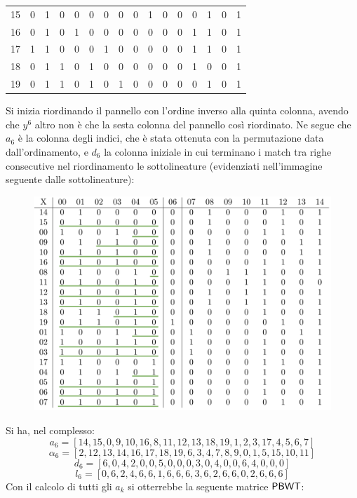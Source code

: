 \begin{esempio}
\begin{table}[H]
\begin{tabular}{c|ccccccccccccccc}
      15 & 0 & 1 & 0 & 0 & 0 & 0 & 0 & 0 & 1 & 0 & 0 & 0 & 1 & 0 & 1 \\
      16 & 0 & 1 & 0 & 1 & 0 & 0 & 0 & 0 & 0 & 0 & 0 & 1 & 1 & 0 & 1 \\
      17 & 1 & 1 & 0 & 0 & 0 & 1 & 0 & 0 & 0 & 0 & 0 & 1 & 1 & 0 & 1 \\
      18 & 0 & 1 & 1 & 0 & 1 & 0 & 0 & 0 & 0 & 0 & 0 & 1 & 0 & 0 & 1 \\
      19 & 0 & 1 & 1 & 0 & 1 & 0 & 1 & 0 & 0 & 0 & 0 & 0 & 1 & 0 & 1 
    \end{tabular}
  \end{table}
  Si inizia riordinando il pannello con l'ordine inverso alla
  quinta colonna, avendo che $y^6$ altro non è che la sesta colonna del pannello
  così riordinato. Ne segue che $a_6$ è la colonna degli indici, che è stata
  ottenuta con la permutazione data dall'ordinamento, e $d_6$ la
  colonna iniziale in cui terminano i match tra righe consecutive nel
  riordinamento le sottolineature (evidenziati nell'immagine seguente dalle
  sottolineature):   
  \begin{figure}[H]
    \centering
    \includegraphics[scale = 0.325]{img/matrix1.pdf}
  \end{figure}
  \noindent
  Si ha, nel complesso:
  \[a_6=[14,15,0,9,10,16,8,11,12,13,18,19,1,2,3,17,4,5,6,7]\]
  \[\alpha_6=[2,12,13,14,16,17,18,19,6,3,4,7,8,9,0,1,5,15,10,11]\]
  \[d_6=[6,0,4,2,0,0,5,0,0,0,3,0,4,0,0,6,4,0,0,0]\]
  \[l_6=[0,6,2,4,6,6,1,6,6,6,3,6,2,6,6,0,2,6,6,6]\]
  Con il calcolo di tutti gli $a_k$ si otterrebbe la seguente matrice $\mbox{\rm {\sf PBWT}}$:
  \begin{table}[H]
  \centering
  \scriptsize
  \begin{tabular}{c|ccccccccccccccc}

\end{tabular}
\end{table}
\end{esempio}

